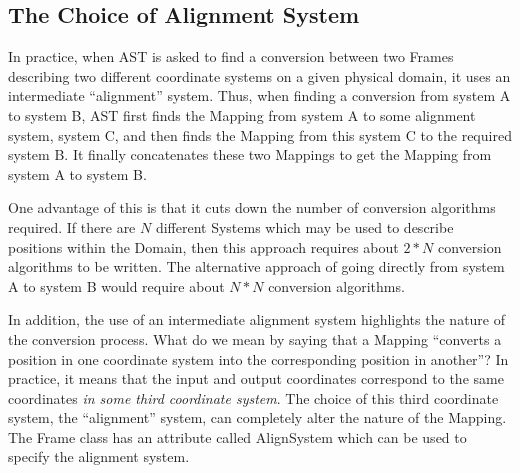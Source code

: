 \documentclass[twoside,11pt]{article}
\newcommand{\secref}[1]{\S\ref{#1}}
\newcommand{\secref}[1]{\ref{#1}}
\begin{document}
%
%

\subsection{\label{ss:alignmentsystem}The Choice of Alignment System}

In practice, when AST is asked to find a conversion between two Frames
describing two different coordinate systems on a given physical domain,
it uses an intermediate ``alignment'' system. Thus, when finding a
conversion from system A to system B, AST first finds the Mapping from
system A to some alignment system, system C, and then finds the Mapping
from this system C to the required system B. It finally concatenates
these two Mappings to get the Mapping from system A to system B.

One advantage of this is that it cuts down the number of conversion
algorithms required. If there are $N$ different Systems which may be used
to describe positions within the Domain, then this approach requires
about $2*N$ conversion algorithms to be written. The alternative approach
of going directly from system A to system B would require about $N*N$
conversion algorithms.

In addition, the use of an intermediate alignment system highlights the
nature of the conversion process. What do we mean by saying that a
Mapping ``converts a position in one coordinate system into the
corresponding position in another''? In practice, it means that the input
and output coordinates correspond to the same coordinates \emph{in some
third coordinate system}. The choice of this third coordinate system, the
``alignment'' system, can completely alter the nature of the Mapping. The
Frame class has an attribute called AlignSystem which can be used to
specify the alignment system.
\end{document}
